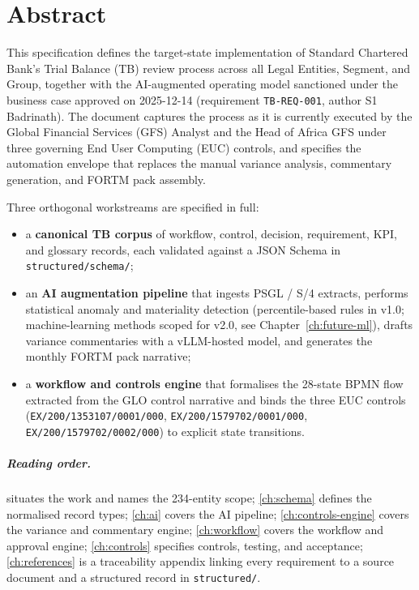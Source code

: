 \chapter*{Abstract}

This specification defines the target-state implementation of Standard
Chartered Bank's Trial Balance (TB) review process across all Legal
Entities, Segment, and Group, together with the AI-augmented operating
model sanctioned under the business case approved on 2025-12-14
(requirement \texttt{TB-REQ-001}, author S1 Badrinath). The document
captures the process as it is currently executed by the Global Financial
Services (GFS) Analyst and the Head of Africa GFS under three governing
End User Computing (EUC) controls, and specifies the automation
envelope that replaces the manual variance analysis, commentary
generation, and FORTM pack assembly.

Three orthogonal workstreams are specified in full:

\begin{itemize}
  \item a \textbf{canonical TB corpus} of workflow, control, decision,
        requirement, KPI, and glossary records, each validated against
        a JSON Schema in \corpus\texttt{structured/schema/};
  \item an \textbf{AI augmentation pipeline} that ingests
        PSGL / S/4 extracts, performs statistical anomaly and materiality
        detection (percentile-based rules in v1.0; machine-learning
        methods scoped for v2.0, see Chapter~\ref{ch:future-ml}),
        drafts variance commentaries with a vLLM-hosted model, and
        generates the monthly FORTM pack narrative;
  \item a \textbf{workflow and controls engine} that formalises the
        28-state BPMN flow extracted from the GLO control narrative
        and binds the three EUC controls (\texttt{EX/200/1353107/0001/000},
        \texttt{EX/200/1579702/0001/000}, \texttt{EX/200/1579702/0002/000})
        to explicit state transitions.
\end{itemize}

\paragraph{Reading order.}  situates the work and
names the 234-entity scope; \cref{ch:schema} defines the normalised
record types; \cref{ch:ai} covers the AI pipeline; \cref{ch:controls-engine}
covers the variance and commentary engine; \cref{ch:workflow} covers
the workflow and approval engine; \cref{ch:controls} specifies controls,
testing, and acceptance; \cref{ch:references} is a traceability
appendix linking every requirement to a source document and a structured
record in \corpus\texttt{structured/}.

